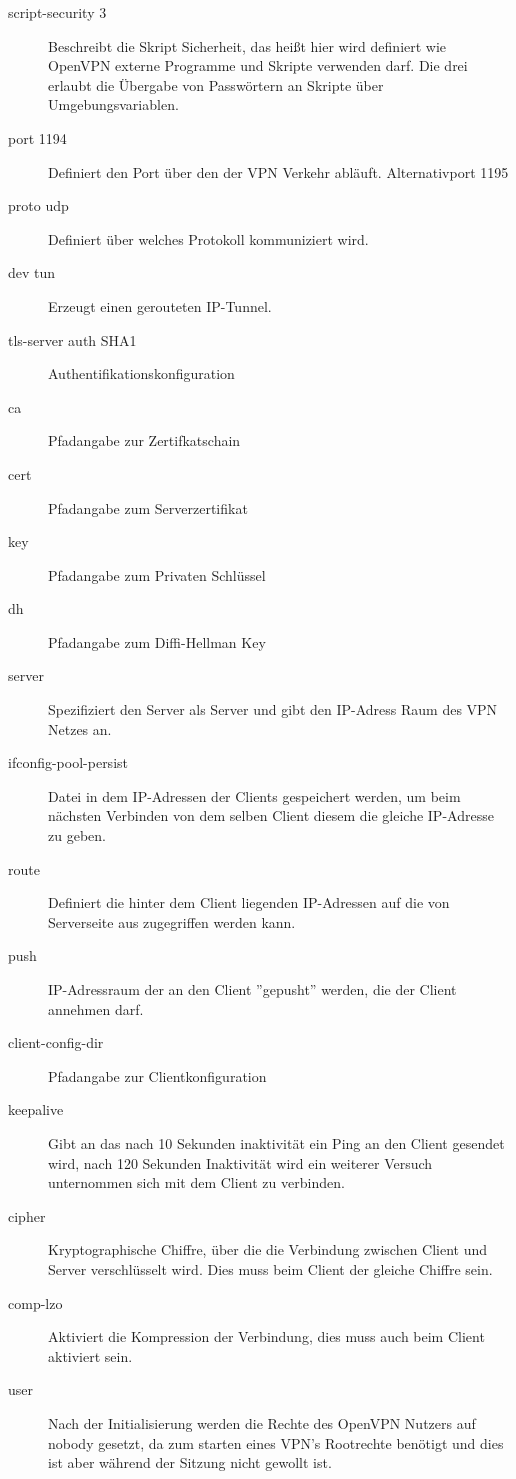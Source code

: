 \begin{description}
	\item[script-security 3]
	Beschreibt die Skript Sicherheit, das heißt hier wird definiert wie OpenVPN externe Programme und Skripte verwenden darf. Die drei  erlaubt die Übergabe von Passwörtern an Skripte über Umgebungsvariablen.
	\item[port 1194] Definiert den Port über den der VPN Verkehr abläuft. Alternativport 1195
	\item[proto udp] Definiert über welches Protokoll kommuniziert wird. 
	\item[dev tun] Erzeugt einen gerouteten IP-Tunnel.
	\item[tls-server auth SHA1] Authentifikationskonfiguration
	\item[ca] Pfadangabe zur Zertifkatschain
	\item[cert] Pfadangabe zum Serverzertifikat 
	\item[key] Pfadangabe zum Privaten Schlüssel
	\item[dh] Pfadangabe zum Diffi-Hellman Key 
	\item[server] Spezifiziert den Server als Server und gibt den IP-Adress Raum des VPN Netzes an.	
	\item[ifconfig-pool-persist] Datei in dem IP-Adressen der Clients gespeichert werden, um beim nächsten Verbinden von dem selben Client diesem die gleiche IP-Adresse zu geben. 
	\item[route] Definiert die hinter dem Client liegenden IP-Adressen auf die von Serverseite aus zugegriffen werden kann.
	\item[push] IP-Adressraum der an den Client ''gepusht'' werden, die der Client annehmen darf. 
	\item[client-config-dir] Pfadangabe zur Clientkonfiguration
	\item[keepalive] Gibt an das nach 10 Sekunden inaktivität ein Ping an den Client gesendet wird, nach 120 Sekunden Inaktivität wird ein weiterer Versuch unternommen sich mit dem Client zu verbinden.
	\item[cipher] Kryptographische Chiffre, über die die Verbindung zwischen Client und Server verschlüsselt wird. Dies muss beim Client der gleiche Chiffre sein.
	\item[comp-lzo] Aktiviert die Kompression der Verbindung, dies muss auch beim Client aktiviert sein.
	\item[user] Nach der Initialisierung werden die Rechte des OpenVPN Nutzers auf nobody gesetzt, da zum starten eines VPN's Rootrechte benötigt und dies ist aber während der Sitzung nicht gewollt ist.

\end{description}
